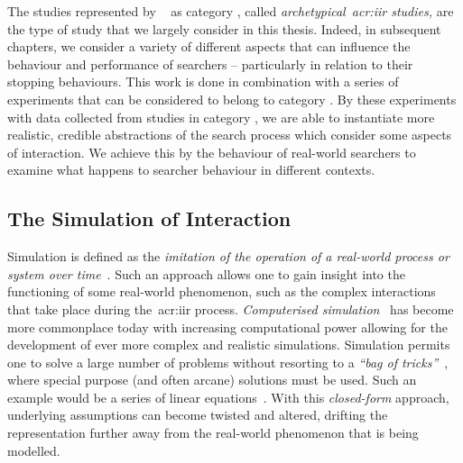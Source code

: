 The studies represented by ~\cite{kelly2009iir} as category , called \emph{archetypical~\gls{acr:iir} studies,} are the type of study that we largely consider in this thesis. Indeed, in subsequent chapters, we consider a variety of different aspects that can influence the behaviour and performance of searchers -- particularly in relation to their stopping behaviours. This work is done in combination with a series of experiments that can be considered to belong to category . By  these experiments with data collected from studies in category , we are able to instantiate more realistic, credible abstractions of the search process which consider some aspects of interaction. We achieve this by  the behaviour of real-world searchers to examine what happens to searcher behaviour in different contexts.

\subsection{The Simulation of Interaction}\label{sec:ir_background:user:simulation}
Simulation is defined as the \emph{imitation of the operation of a real-world process or system over time}~\citep{banks1996discrete}. Such an approach allows one to gain insight into the functioning of some real-world phenomenon, such as the complex interactions that take place during the~\gls{acr:iir} process. \emph{Computerised simulation}~\citep{heermann1990computer_simulation} has become more commonplace today with increasing computational power allowing for the development of ever more complex and realistic simulations. Simulation permits one to solve a large number of problems without resorting to a \emph{``bag of tricks''}~\citep{fishwick1995simulation}, where special purpose (and often arcane) solutions must be used. Such an example would be a series of linear equations~\citep{fishwick1995simulation}. With this \emph{closed-form} approach, underlying assumptions can become twisted and altered, drifting the representation further away from the real-world phenomenon that is being modelled.

